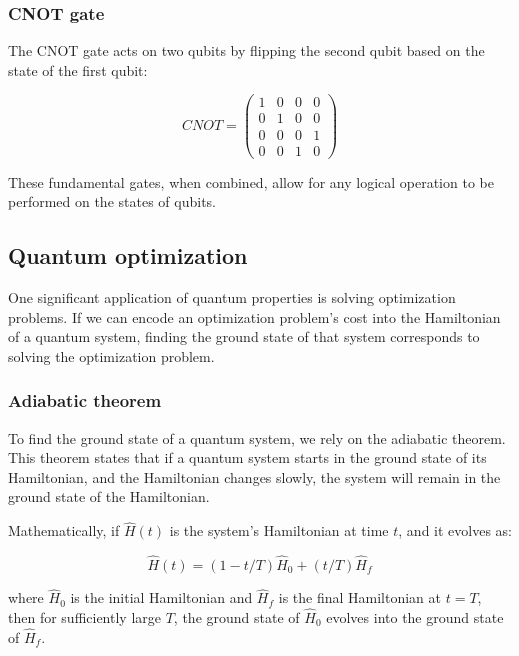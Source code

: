 \documentclass{article}
\begin{document}
\begin{multicols}{2}
\subsubsection{CNOT gate}

The CNOT gate acts on two qubits by flipping the second qubit based on the state of the first qubit:

\begin{equation}
    CNOT = \begin{pmatrix} 1 & 0 & 0 & 0 \\ 0 & 1 & 0 & 0 \\ 0 & 0 & 0 & 1 \\ 0 & 0 & 1 & 0 \end{pmatrix}
\end{equation}

These fundamental gates, when combined, allow for any logical operation to be performed on the states of qubits.

\subsection{Quantum optimization}

One significant application of quantum properties is solving optimization problems. If we can encode an optimization problem’s cost into the Hamiltonian of a quantum system, finding the ground state of that system corresponds to solving the optimization problem.

\subsubsection{Adiabatic theorem}

To find the ground state of a quantum system, we rely on the adiabatic theorem. This theorem states that if a quantum system starts in the ground state of its Hamiltonian, and the Hamiltonian changes slowly, the system will remain in the ground state of the Hamiltonian.

Mathematically, if \( \hat{H}(t) \) is the system’s Hamiltonian at time \( t \), and it evolves as:

\begin{equation}
    \hat{H}(t) = (1 - t/T)\hat{H}_0 + (t/T)\hat{H}_f
\end{equation}

where \( \hat{H}_0 \) is the initial Hamiltonian and \( \hat{H}_f \) is the final Hamiltonian at \( t = T \), then for sufficiently large \( T \), the ground state of \( \hat{H}_0 \) evolves into the ground state of \( \hat{H}_f \).


\end{multicols}
\end{document}
